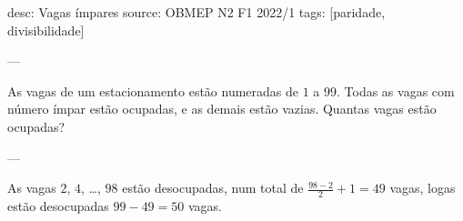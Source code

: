 desc:  Vagas ímpares
source:  OBMEP N2 F1 2022/1
tags:  [paridade, divisibilidade]

---

As vagas de um estacionamento estão numeradas de $1$ a $99$. Todas as vagas com número ímpar estão ocupadas, e as demais estão vazias. Quantas vagas estão ocupadas?

---

As vagas $2$, $4$, \dots, $98$ estão desocupadas, num total de $\frac{98 - 2}{2} + 1 = 49$ vagas, logas estão desocupadas $99 - 49 = 50$ vagas.
